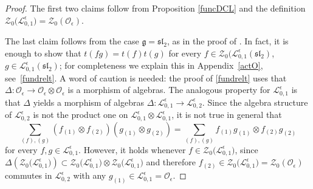 \documentclass[pdftex]{sigma}
\numberwithin{equation}{section}
\theoremstyle{definition}
\newcommand{\e}{\epsilon}
\newcommand{\Ll}{{\mathcal L}}
\newcommand{\Oo}{{\mathcal O}}
\newcommand{\ra}{\rightarrow}
\begin{document}
\begin{proof} The first two claims follow from Proposition \ref{funcDCL} and the definition ${\mathcal{Z}_0\bigl(\Ll_{0,1}^\e\bigr) = \mathcal{Z}_0(\Oo_\e)}$.

The last claim follows from the case $\mathfrak{g}={\mathfrak{sl}_2}$, as in the proof of \cite[Proposition~7.1]{DC-L}. In fact, it is enough to show that $t(fg) = t(f)t(g)$ for every $f\in \mathcal{Z}_0(\Ll_{0,1}^\e({\mathfrak{sl}_2})$, $g\in \Ll_{0,1}^\e({\mathfrak{sl}_2})$; for completeness we explain this in Appendix~\ref{actO}, see~\eqref{fundrelt}. A word of caution is needed: the proof of \eqref{fundrelt} uses that $\Delta\colon \Oo_\e \ra \Oo_\e \otimes \Oo_\e$ is a morphism of algebras. The analogous property for $\Ll_{0,1}^\e$ is that $\Delta$ yields a morphism of algebras $\Delta\colon \Ll_{0,1}^\e \ra \Ll_{0,2}^\e$. Since the algebra structure of $\Ll_{0,2}^\e$ is not the product one on $\Ll_{0,1}^\e\otimes \Ll_{0,1}^\e$, it is not true in general that
\[ \sum_{(f),(g)} (f_{(1)}\otimes f_{(2)})(g_{(1)} \otimes g_{(2)}) = \sum_{(f),(g)} f_{(1)}g_{(1)}\otimes f_{(2)}g_{(2)}
\]
 for every $f,g\in \Ll_{0,1}^\e$. However, it holds whenever $f\in \mathcal{Z}_0\bigl(\Ll_{0,1}^\e\bigr)$, since $\Delta(\mathcal{Z}_0\bigl(\Ll_{0,1}^\e\bigr)) \subset \mathcal{Z}_0\bigl(\Ll_{0,1}^\e\bigr) \otimes \mathcal{Z}_0\bigl(\Ll_{0,1}^\e\bigr)$ and therefore $f_{(2)}\in \mathcal{Z}_0\bigl(\Ll_{0,1}^\e\bigr) = \mathcal{Z}_0(\Oo_\e)$ commutes in $\Ll_{0,2}^\e$ with any ${g_{(1)}\in \Ll_{0,1}^\e = \Oo_\e}$.


\end{proof}
\end{document}
